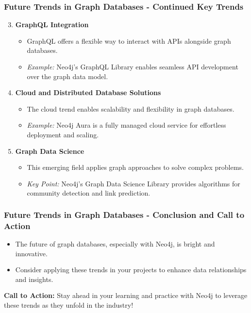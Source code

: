 \documentclass[aspectratio=169]{beamer}
\begin{document}
\begin{frame}[fragile]
    \frametitle{Future Trends in Graph Databases - Continued Key Trends}
    \begin{enumerate}
        \setcounter{enumi}{2}
        \item \textbf{GraphQL Integration}
        \begin{itemize}
            \item GraphQL offers a flexible way to interact with APIs alongside graph databases.
            \item \textit{Example:} Neo4j's GraphQL Library enables seamless API development over the graph data model.
        \end{itemize}
        
        \item \textbf{Cloud and Distributed Database Solutions}
        \begin{itemize}
            \item The cloud trend enables scalability and flexibility in graph databases.
            \item \textit{Example:} Neo4j Aura is a fully managed cloud service for effortless deployment and scaling.
        \end{itemize}
        
        \item \textbf{Graph Data Science}
        \begin{itemize}
            \item This emerging field applies graph approaches to solve complex problems.
            \item \textit{Key Point:} Neo4j's Graph Data Science Library provides algorithms for community detection and link prediction.
        \end{itemize}
    \end{enumerate}
\end{frame}

\begin{frame}[fragile]
    \frametitle{Future Trends in Graph Databases - Conclusion and Call to Action}
    \begin{itemize}
        \item The future of graph databases, especially with Neo4j, is bright and innovative.
        \item Consider applying these trends in your projects to enhance data relationships and insights.
    \end{itemize}
    
    \textbf{Call to Action:} Stay ahead in your learning and practice with Neo4j to leverage these trends as they unfold in the industry!
\end{frame}
\end{document}
